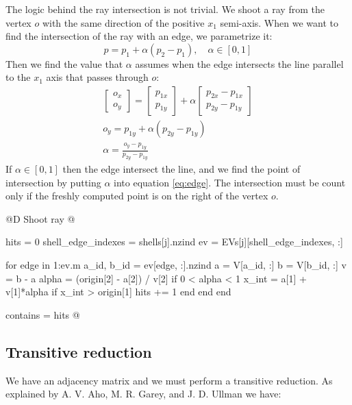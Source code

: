 \documentclass[10pt]{book}
\begin{document}
The logic behind the ray intersection is not trivial.
We shoot a ray from the vertex $o$ with the same direction
of the positive $x_1$ semi-axis.
When we want to find the intersection of the ray with an edge,
we parametrize it:
\begin{equation}
\label{eq:edge}
    p = p_1 + \alpha(p_2-p_1), \quad\alpha\in[0, 1]
\end{equation}
Then we find the value that $\alpha$ assumes when the edge
intersects the line parallel to the $x_1$ axis that passes through $o$:
\begin{gather*}
    \begin{bmatrix}
        o_x \\ o_y
    \end{bmatrix}
    = 
    \begin{bmatrix}
        p_{1x} \\ p_{1y}
    \end{bmatrix}
    +
    \alpha
    \begin{bmatrix}
        p_{2x} - p_{1x} \\ p_{2y} - p_{1y}
    \end{bmatrix} \\
    o_y = p_{1y} + \alpha(p_{2y} - p_{1y}) \\
    \alpha = \frac{o_y - p_{1y}}{p_{2y} - p_{1y}}
\end{gather*}
If $\alpha\in[0, 1]$ then the edge intersect the line, and we find the point
of intersection by putting $\alpha$ into equation \ref{eq:edge}.
The intersection must be count only if the freshly computed point
is on the right of the vertex $o$.

@D Shoot ray
@{hits = 0
shell_edge_indexes = shells[j].nzind
ev = EVs[j][shell_edge_indexes, :]

for edge in 1:ev.m
    a_id, b_id = ev[edge, :].nzind
    a = V[a_id, :]
    b = V[b_id, :]
    v = b - a
    alpha = (origin[2] - a[2]) / v[2]
    if 0 < alpha < 1
        x_int = a[1] + v[1]*alpha
        if x_int > origin[1]
            hits += 1
        end
    end
end

contains = hits %
@}

\subsection{Transitive reduction}

We have an adjacency matrix and we must perform a transitive reduction.
As explained by A. V. Aho, M. R. Garey, and J. D. Ullman \cite{parallel_transitive_reduction}
we have:
\end{document}
